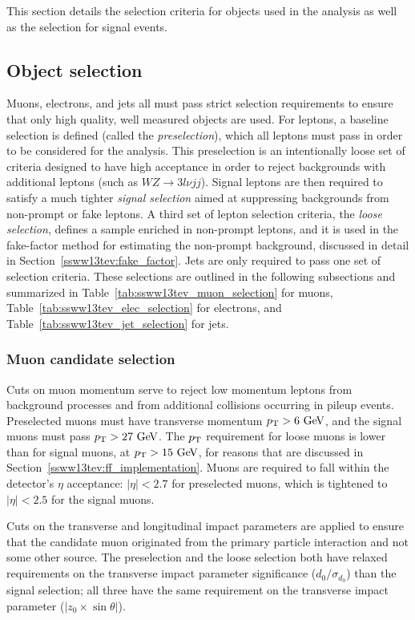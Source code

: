 This section details the selection criteria for objects used in the analysis as well as the selection for signal events.

\subsection{Object selection}\label{ssww13tev:object_selection}
Muons, electrons, and jets all must pass strict selection requirements to ensure that only high quality, well measured objects are used.
For leptons, a baseline selection is defined (called the \emph{preselection}), which all leptons must pass in order to be considered for the analysis.
This preselection is an intentionally loose set of criteria designed to have high acceptance in order to reject backgrounds with additional leptons (such as $WZ\rightarrow 3l\nu jj$).
Signal leptons are then required to satisfy a much tighter \emph{signal selection} aimed at suppressing backgrounds from non-prompt or fake leptons.
A third set of lepton selection criteria, the \emph{loose selection}, defines a sample enriched in non-prompt leptons, and it is used in the fake-factor method for estimating the non-prompt background, discussed in detail in Section~\ref{ssww13tev:fake_factor}.
Jets are only required to pass one set of selection criteria.
These selections are outlined in the following subsections and summarized in Table~\ref{tab:ssww13tev_muon_selection} for muons, Table~\ref{tab:ssww13tev_elec_selection} for electrons, and Table~\ref{tab:ssww13tev_jet_selection} for jets.

\subsubsection{Muon candidate selection}
Cuts on muon momentum serve to reject low momentum leptons from background processes and from additional collisions occurring in pileup events.
Preselected muons must have transverse momentum $\pt > 6\gev$, and the signal muons must pass $\pt > 27\gev$.
The $p_{\mathrm{T}}$ requirement for loose muons is lower than for signal muons, at $\pt > 15\gev$, for reasons that are discussed in Section~\ref{ssww13tev:ff_implementation}.
Muons are required to fall within the detector's $\eta$ acceptance: $|\eta| < 2.7$ for preselected muons, which is tightened to $|\eta| < 2.5$ for the signal muons.

Cuts on the transverse and longitudinal impact parameters are applied to ensure that the candidate muon originated from the primary particle interaction and not some other source.
The preselection and the loose selection both have relaxed requirements on the transverse impact parameter significance ($d_0/\sigma_{d_{0}}$) than the signal selection; all three have the same requirement on the transverse impact parameter ($|z_0\times\sin\theta|$).

